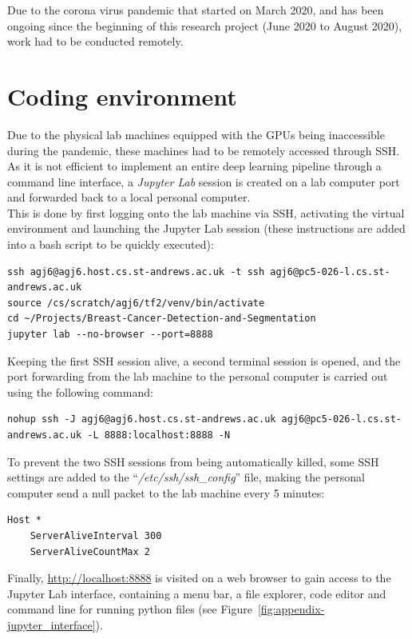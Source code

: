 Due to the corona virus pandemic that started on March 2020, and has been ongoing since the beginning of this research project (June 2020 to August 2020), work had to be conducted remotely.

\section{Coding environment}

Due to the physical lab machines equipped with the GPUs being inaccessible during the pandemic, these machines had to be remotely accessed through SSH. As it is not efficient to implement an entire deep learning pipeline through a command line interface, a \textit{Jupyter Lab} session is created on a lab computer port and forwarded back to a local personal computer.\\

This is done by first logging onto the lab machine via SSH, activating the virtual environment and launching the Jupyter Lab session (these instructions are added into a bash script to be quickly executed):

\begin{lstlisting}
ssh agj6@agj6.host.cs.st-andrews.ac.uk -t ssh agj6@pc5-026-l.cs.st-andrews.ac.uk
source /cs/scratch/agj6/tf2/venv/bin/activate
cd ~/Projects/Breast-Cancer-Detection-and-Segmentation
jupyter lab --no-browser --port=8888
\end{lstlisting}

Keeping the first SSH session alive, a second terminal session is opened, and the port forwarding from the lab machine  to the personal computer is carried out using  the following command:

\begin{lstlisting}
nohup ssh -J agj6@agj6.host.cs.st-andrews.ac.uk agj6@pc5-026-l.cs.st-andrews.ac.uk -L 8888:localhost:8888 -N
\end{lstlisting}

To prevent the two SSH sessions from being automatically killed, some SSH settings are added to the ``\textit{/etc/ssh/ssh\_config}'' file, making the personal computer send a null packet to the lab machine every 5 minutes:

\begin{lstlisting}
Host *
    ServerAliveInterval 300
    ServerAliveCountMax 2
\end{lstlisting}

Finally, \url{http://localhost:8888}  is visited on a web browser to gain access to  the Jupyter Lab interface, containing a menu bar, a file explorer, code editor and command line for running python files (see Figure~\ref{fig:appendix-jupyter_interface}).

